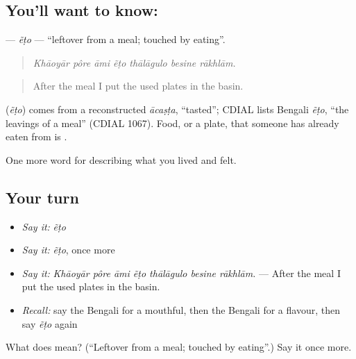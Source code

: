 \subsection*{You'll want to know: }
\textbf{} — \emph{ẽṭo} — \textquotedblleft{}leftover from a meal; touched by eating\textquotedblright{}.

\begin{quote}
      
\end{quote}

\begin{quote}
\emph{Khāoyār pôre āmi ẽṭo thālāgulo besine rākhlām.}
\end{quote}

\begin{quote}
After the meal I put the used plates in the basin.
\end{quote}

\begin{cousinweb}
\textbf{} (\emph{ẽṭo}) comes from a reconstructed \emph{ācaṣṭa}, \textquotedblleft{}tasted\textquotedblright{}; CDIAL lists Bengali \emph{ẽṭo}, \textquotedblleft{}the leavings of a meal\textquotedblright{} (CDIAL 1067). Food, or a plate, that someone has already eaten from is .
\end{cousinweb}

\begin{grammarlens}[title={What you've built}]
One more word for describing what you lived and felt.
\end{grammarlens}

\subsection*{Your turn}
\begin{itemize}
\raggedright
  \item \emph{Say it:} \emph{ẽṭo}
  \item \emph{Say it:} \emph{ẽṭo}, once more
  \item \emph{Say it:} \emph{Khāoyār pôre āmi ẽṭo thālāgulo besine rākhlām.} — After the meal I put the used plates in the basin.
  \item \emph{Recall:} say the Bengali for a mouthful, then the Bengali for a flavour, then say \emph{ẽṭo} again
\end{itemize}

\begin{tcolorbox}[breakable,colback=teal!4,colframe=teal!35!black,title={Before you move on}]
What does  mean? (\textquotedblleft{}Leftover from a meal; touched by eating\textquotedblright{}.) Say it once more.
\end{tcolorbox}
